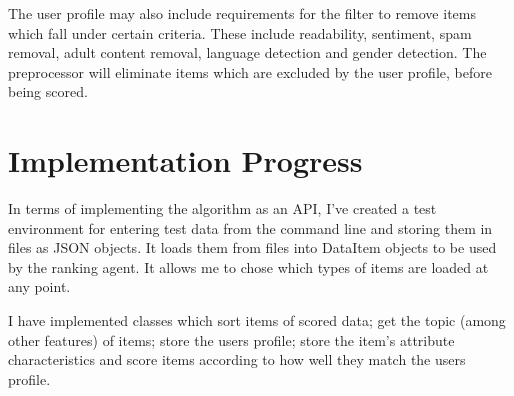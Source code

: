 The user profile may also include requirements for the filter to remove items which fall under certain criteria. These include readability, sentiment, spam removal, adult content removal, language detection and gender detection. The preprocessor will eliminate items which are excluded by the user profile, before being scored. 

\section{Implementation Progress}

In terms of implementing the algorithm as an API, I've created a test environment for entering test data from the command line and storing them in files as JSON objects. It loads them from files into DataItem objects to be used by the ranking agent. It allows me to chose which types of items are loaded at any point. 

I have implemented classes which sort items of scored data; get the topic (among other features) of items; store the users profile; store the item's attribute characteristics and score items according to how well they match the users profile. 